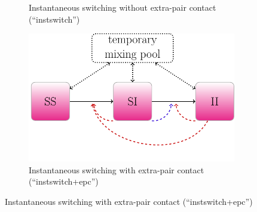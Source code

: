 \documentclass[10pt,letterpaper]{article}
\begin{document}
\begin{figure}[t!p]

\begin{subfigure}[b]{0.4\linewidth}
	\centering
\caption{Instantaneous switching without extra-pair contact (``instswitch'')}
\end{subfigure}
\begin{subfigure}[b]{0.4\linewidth}
	\centering
	  \includegraphics[width=0.9\linewidth]{../figures/tikz-f2}
\caption{Instantaneous switching with extra-pair contact (``instswitch+epc'')}
\end{subfigure}


\end{figure}
\end{document}
